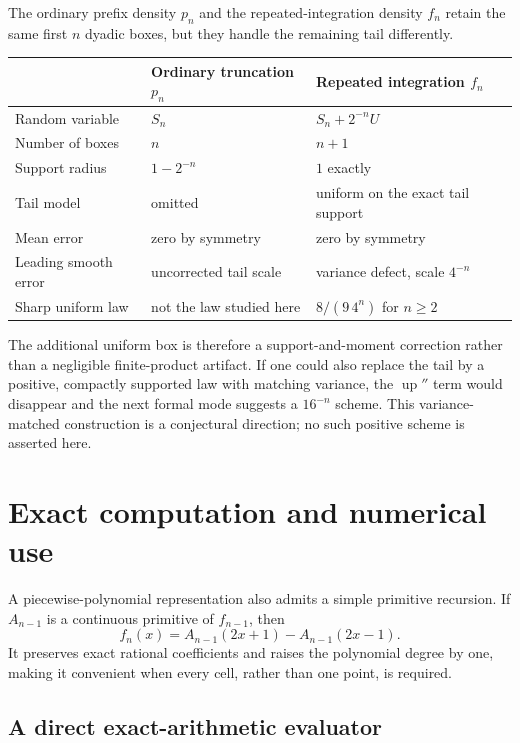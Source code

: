 \documentclass[11pt,oneside]{article}
\theoremstyle{definition}
\theoremstyle{remark}
\newcommand{\Up}{\operatorname{up}}
\begin{document}
The ordinary prefix density $p_n$ and the repeated-integration density $f_n$ retain the
same first $n$ dyadic boxes, but they handle the remaining tail differently.
\begin{center}
\begin{tabularx}{0.96\textwidth}{@{}p{}XX@{}}
\toprule
 & Ordinary truncation $p_n$ & Repeated integration $f_n$\\
\midrule
Random variable & $S_n$ & $S_n+2^{-n}U$\\
Number of boxes & $n$ & $n+1$\\
Support radius & $1-2^{-n}$ & $1$ exactly\\
Tail model & omitted & uniform on the exact tail support\\
Mean error & zero by symmetry & zero by symmetry\\
Leading smooth error & uncorrected tail scale & variance defect, scale $4^{-n}$\\
Sharp uniform law & not the law studied here & $8/(9\,4^n)$ for $n\ge2$\\
\bottomrule
\end{tabularx}
\end{center}
The additional uniform box is therefore a support-and-moment correction rather than a
negligible finite-product artifact.  If one could also replace the tail by a positive,
compactly supported law with matching variance, the $\Up''$ term would disappear and the
next formal mode suggests a $16^{-n}$ scheme.  This variance-matched construction is a
conjectural direction; no such positive scheme is asserted here.

\section{Exact computation and numerical use}
\label{repeated2:sec:computation}

A piecewise-polynomial representation also admits a simple primitive recursion.  If
$A_{n-1}$ is a continuous primitive of $f_{n-1}$, then
\begin{equation}
 f_n(x)=A_{n-1}(2x+1)-A_{n-1}(2x-1).
 \label{repeated2:eq:primitive-algorithm}
\end{equation}
It preserves exact rational coefficients and raises the polynomial degree by one, making
it convenient when every cell, rather than one point, is required.

\subsection{A direct exact-arithmetic evaluator}
\end{document}
